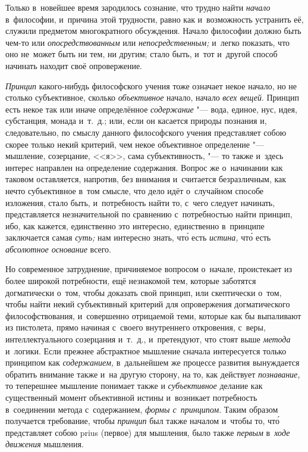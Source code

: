 Только в~новейшее время зародилось сознание, что трудно найти {\em начало}
в~философии, и~причина этой трудности,
равно как и~возможность устранить её, служили предметом
многократного обсуждения. Начало философии должно быть чем-то или {\em
опосредствованным} или {\em непосредственным;} и~легко показать, что оно
не~может быть ни тем, ни другим; стало быть, и~тот и~другой способ начинать
находит своё опровержение.

{\em Принцип} какого-нибудь философского учения тоже означает некое начало, но
не столько субъективное, сколько {\em объективное} начало, начало
{\em всех вещей}. Принцип есть некое так или иначе определённое
{\em содержание} "--- вода, единое, нус, идея, субстанция,
монада и~т.~д.; или, если он касается природы познания и, следовательно, по
смыслу данного философского учения представляет собою скорее только некий
критерий, чем некое объективное определение "--- мышление, созерцание, <<я>>,
сама субъективность, "--- то также и~здесь интерес направлен на определение
содержания. Вопрос же о~начинании как таковом оставляется, напротив, без
внимания и~считается безразличным, как нечто субъективное в~том смысле, что
дело идёт о~случайном способе изложения, стало быть, и~потребность найти то,
с~чего следует начинать, представляется незначительной по сравнению
с~потребностью найти принцип, ибо, как кажется, единственно это интересно,
единственно в~принципе заключается самая {\em суть;} нам интересно знать,
чт\'{о} есть {\em истина,} чт\'{о} есть {\em абсолютное основание} всего.

Но современное затруднение, причиняемое вопросом о~начале, проистекает из более
широкой потребности, ещё незнакомой тем, которые заботятся догматически о~том,
чтобы доказать свой принцип, или скептически о~том, чтобы найти некий
субъективный критерий для опровержения догматического философствования,
и~совершенно отрицаемой теми, которые как бы выпаливают из пистолета, прямо
начиная с~своего внутреннего откровения, с~веры, интеллектуального созерцания
и~т.~д., и~претендуют, что стоят выше {\em метода} и~логики. Если прежнее
абстрактное мышление сначала интересуется только принципом как
{\em содержанием,} в~дальнейшем же процессе развития вынуждается обратить
внимание также и~на другую сторону, на то, как действует {\em познавание,}
то теперешнее мышление понимает также и {\em субъективное} делание как
существенный момент объективной истины и~возникает потребность в~соединении
метода с~содержанием, {\em формы с~принципом}. Таким образом получается
требование, чтобы {\em принцип} был также началом и~чтобы то, чт\'{о}
представляет собою prius (первое) для мышления, было также {\em первым}
в~{\em ходе движения} мышления.

